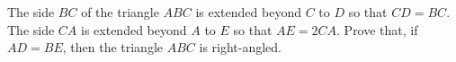 The side $BC$ of the triangle $ABC$ is extended beyond $C$ to $D$ so that $CD = BC$.  The side $CA$ is extended beyond $A$ to $E$ so that $AE = 2CA$.  Prove that, if $AD=BE$, then the triangle $ABC$ is right-angled.